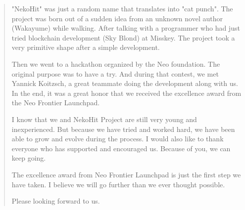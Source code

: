 \begin{quotation}
    "NekoHit" was just a random name that translates into "cat punch".
    The project was born out of a sudden idea from an unknown novel author
    (Wakayume) while walking.
    After talking with a programmer who had just tried blockchain development
    (Sky Blond) at Misskey.
    The project took a very primitive shape after a simple development.

    Then we went to a hackathon organized by the Neo foundation.
    The original purpose was to have a try.
    And during that contest, we met Yannick Koitzsch, a great teammate doing
    the development along with us.
    In the end, it was a great honor that we received the excellence award
    from the Neo Frontier Launchpad.

    I know that we and NekoHit Project are still very young and inexperienced.
    But because we have tried and worked hard, we have been able to grow and
    evolve during the process.
    I would also like to thank everyone who has supported and encouraged us.
    Because of you, we can keep going.

    The excellence award from Neo Frontier Launchpad is just the first step
    we have taken.
    I believe we will go further than we ever thought possible.

    Please looking forward to us.

\end{quotation}


